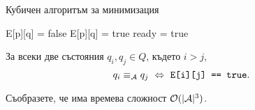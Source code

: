 


\begin{algorithm}[H]
  \caption{Кубичен алгоритъм за минимизация}
  \label{alg:minimisation-cube}
  \begin{algorithmic}[1]
    \State E[p][q] = false 
    \Else
    \State E[p][q] = true 
    \EndIf
    \EndFor
    \EndFor
    \Repeat
    \State ready = true
      
    \EndIf
    \EndFor
    \EndIf
    \EndFor
    \EndFor
  \end{algorithmic}
\end{algorithm}

\begin{proposition}
  За всеки две състояния $q_i,q_j \in Q$, където $i > j$,
  \[q_i \equiv_{\mathcal{A}} q_j \ \Leftrightarrow\  \texttt{E[i][j] == true}.\]
\end{proposition}

\begin{problem}
  Съобразете, че  има времева сложност $\mathcal{O}(|\mathcal{A}|^3)$.
\end{problem}


